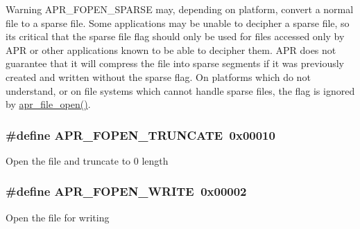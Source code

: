 \begin{DoxyWarning}{Warning}
A\+P\+R\+\_\+\+F\+O\+P\+E\+N\+\_\+\+S\+P\+A\+R\+SE may, depending on platform, convert a normal file to a sparse file. Some applications may be unable to decipher a sparse file, so it\textquotesingle{}s critical that the sparse file flag should only be used for files accessed only by A\+PR or other applications known to be able to decipher them. A\+PR does not guarantee that it will compress the file into sparse segments if it was previously created and written without the sparse flag. On platforms which do not understand, or on file systems which cannot handle sparse files, the flag is ignored by \hyperlink{group__apr__file__io_gabda14cbf242fb4fe99055434213e5446}{apr\+\_\+file\+\_\+open()}. 
\end{DoxyWarning}
\subsubsection[{\texorpdfstring{A\+P\+R\+\_\+\+F\+O\+P\+E\+N\+\_\+\+T\+R\+U\+N\+C\+A\+TE}{APR_FOPEN_TRUNCATE}}]{\setlength{\rightskip}{0pt plus 5cm}\#define A\+P\+R\+\_\+\+F\+O\+P\+E\+N\+\_\+\+T\+R\+U\+N\+C\+A\+TE~0x00010}\hypertarget{group__apr__file__open__flags_ga09b05a5bd5db534b93794f7657bcb146}{}\label{group__apr__file__open__flags_ga09b05a5bd5db534b93794f7657bcb146}
Open the file and truncate to 0 length 
\subsubsection[{\texorpdfstring{A\+P\+R\+\_\+\+F\+O\+P\+E\+N\+\_\+\+W\+R\+I\+TE}{APR_FOPEN_WRITE}}]{\setlength{\rightskip}{0pt plus 5cm}\#define A\+P\+R\+\_\+\+F\+O\+P\+E\+N\+\_\+\+W\+R\+I\+TE~0x00002}\hypertarget{group__apr__file__open__flags_gac598bb95fc9476b0bf2ed0b1c308842c}{}\label{group__apr__file__open__flags_gac598bb95fc9476b0bf2ed0b1c308842c}
Open the file for writing 
